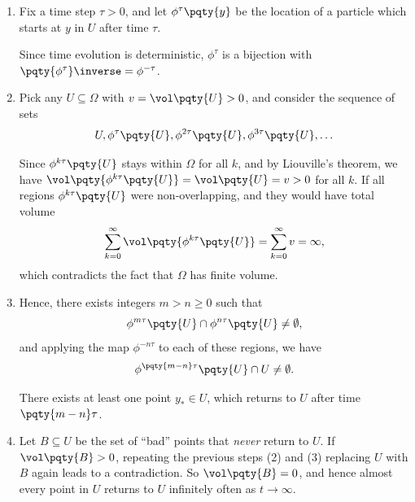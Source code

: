 \begin{enumerate}[label=(\arabic*)]
    \item Fix a time step \(\tau > 0\), and let \(\phi^\tau\pqty{y}\) be the location of a particle which starts at \(y\) in \(U\) after time \(\tau\).
    
    Since time evolution is deterministic, \(\phi^\tau\) is a bijection with \(\pqty{\phi^\tau}\inverse = \phi^{-\tau}\).
    
    \item Pick any \(U \subseteq \Omega\) with \(v = \vol\pqty{U} > 0\), and consider the sequence of sets
    \begin{equation}
        U, \phi^\tau\pqty{U}, \phi^{2 \tau}\pqty{U}, \phi^{3 \tau}\pqty{U}, \ldots
    \end{equation}

    Since \(\phi^{k \tau}\pqty{U}\) stays within \(\Omega\) for all \(k\), and by Liouville's theorem, we have \(\vol\pqty{\phi^{k \tau}\pqty{U}} = \vol\pqty{U} = v > 0\) for all \(k\). If all regions \(\phi^{k \tau}\pqty{U}\) were non-overlapping, and they would have total volume
    \begin{equation}
        \sum_{k = 0}^{\infty} \vol\pqty{\phi^{k \tau}\pqty{U}} = \sum_{k = 0}^{\infty} v = \infty,
    \end{equation}
    which contradicts the fact that \(\Omega\) has finite volume.

    \item Hence, there exists integers \(m > n \geq 0\) such that
    \begin{equation}
        \phi^{m \tau}\pqty{U} \cap \phi^{n \tau}\pqty{U} \neq \emptyset,
    \end{equation}
    and applying the map \(\phi^{- n \tau}\) to each of these regions, we have
    \begin{equation}
        \phi^{\pqty{m - n} \tau} \pqty{U} \cap U \neq \emptyset.
    \end{equation}

    There exists at least one point \(y_{\ast} \in U\), which returns to \(U\) after time \(\pqty{m - n} \tau\).

    \item Let \(B \subseteq U\) be the set of ``bad'' points that \emph{never} return to \(U\). If \(\vol\pqty{B} > 0\), repeating the previous steps (2) and (3) replacing \(U\) with \(B\) again leads to a contradiction. So \(\vol\pqty{B} = 0\), and hence almost every point in \(U\) returns to \(U\) infinitely often as \(t \to \infty\).
\end{enumerate}

